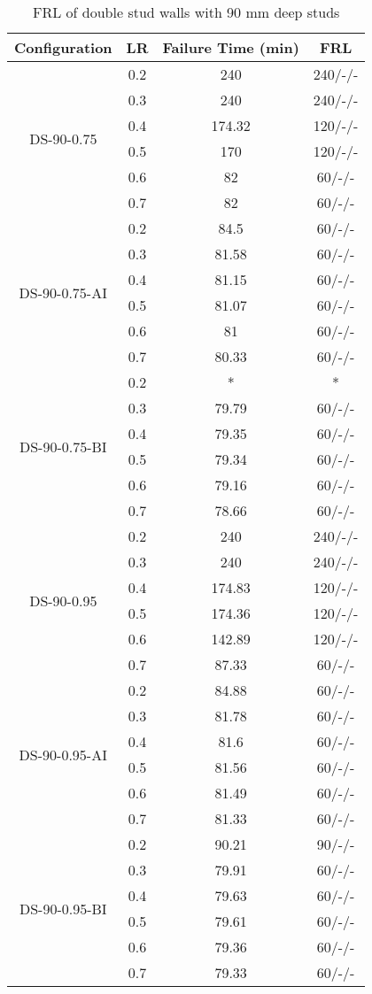\begin{table}[!htbp]
	\centering
	\caption{FRL of double stud walls with 90 mm deep studs}
	  \begin{tabular}{cccc}
	  \toprule
	  Configuration & LR    & Failure Time (min) & FRL \\
	  \midrule
	  \multirow{6}[2]{*}{DS-90-0.75} & 0.2   & 240   & 240/-/- \\
			& 0.3   & 240   & 240/-/- \\
			& 0.4   & 174.32 & 120/-/- \\
			& 0.5   & 170   & 120/-/- \\
			& 0.6   & 82    & 60/-/- \\
			& 0.7   & 82    & 60/-/- \\
	  \midrule
	  \multirow{6}[2]{*}{DS-90-0.75-AI} & 0.2   & 84.5  & 60/-/- \\
			& 0.3   & 81.58 & 60/-/- \\
			& 0.4   & 81.15 & 60/-/- \\
			& 0.5   & 81.07 & 60/-/- \\
			& 0.6   & 81    & 60/-/- \\
			& 0.7   & 80.33 & 60/-/- \\
	  \midrule
	  \multirow{6}[2]{*}{DS-90-0.75-BI} & 0.2   & * & * \\
			& 0.3   & 79.79 & 60/-/- \\
			& 0.4   & 79.35 & 60/-/- \\
			& 0.5   & 79.34 & 60/-/- \\
			& 0.6   & 79.16 & 60/-/- \\
			& 0.7   & 78.66 & 60/-/- \\
	  \midrule
	  \multirow{6}[2]{*}{DS-90-0.95} & 0.2   & 240   & 240/-/- \\
			& 0.3   & 240   & 240/-/- \\
			& 0.4   & 174.83 & 120/-/- \\
			& 0.5   & 174.36 & 120/-/- \\
			& 0.6   & 142.89 & 120/-/- \\
			& 0.7   & 87.33 & 60/-/- \\
	  \midrule
	  \multirow{6}[2]{*}{DS-90-0.95-AI} & 0.2   & 84.88 & 60/-/- \\
			& 0.3   & 81.78 & 60/-/- \\
			& 0.4   & 81.6  & 60/-/- \\
			& 0.5   & 81.56 & 60/-/- \\
			& 0.6   & 81.49 & 60/-/- \\
			& 0.7   & 81.33 & 60/-/- \\
	  \midrule
	  \multirow{6}[2]{*}{DS-90-0.95-BI} & 0.2   & 90.21 & 90/-/- \\
			& 0.3   & 79.91 & 60/-/- \\
			& 0.4   & 79.63 & 60/-/- \\
			& 0.5   & 79.61 & 60/-/- \\
			& 0.6   & 79.36 & 60/-/- \\
			& 0.7   & 79.33 & 60/-/- \\
	  \bottomrule
	  \end{tabular}%
	\label{tab:frl-parametric-ds-90}%


\end{table}
